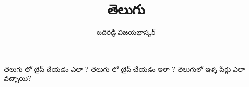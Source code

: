 \documentclass[12pt]{article}
\title{తెలుగు}
\author{బదిరెడ్డి విజయభాస్కర్}
\begin{document}
తెలుగు లో టైప్ చేయడం ఎలా ?
తెలుగు లో టైప్ చేయడం ఇలా ?
తెలుగులో ఇళ్ళ పేర్లు ఎలా వచ్చాయి?
\end{document}
